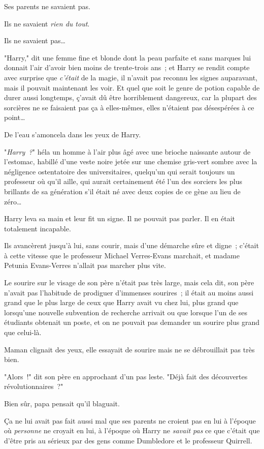 Ses parents ne savaient pas.

Ils ne savaient \emph{rien du tout}.

Ils ne savaient pas…

"Harry," dit une femme fine et blonde dont la peau parfaite et sans marques lui donnait l'air d'avoir bien moins de trente-trois ans~; et Harry se rendit compte avec surprise que \emph{c'était} de la magie, il n'avait pas reconnu les signes auparavant, mais il pouvait maintenant les voir. Et quel que soit le genre de potion capable de durer aussi longtemps, ç'avait dû être horriblement dangereux, car la plupart des sorcières ne se faisaient pas ça à elles-mêmes, elles n'étaient pas désespérées à ce point…

De l'eau s'amoncela dans les yeux de Harry.

"\emph{Harry~?}" héla un homme à l'air plus âgé avec une brioche naissante autour de l'estomac, habillé d'une veste noire jetée sur une chemise gris-vert sombre avec la négligence ostentatoire des universitaires, quelqu'un qui serait toujours un professeur où qu'il aille, qui aurait certainement été l'un des sorciers les plus brillants de sa génération s'il était né avec deux copies de ce gène au lieu de zéro…

Harry leva sa main et leur fit un signe. Il ne pouvait pas parler. Il en était totalement incapable.

Ils avancèrent jusqu'à lui, sans courir, mais d'une démarche sûre et digne~; c'était à cette vitesse que le professeur Michael Verres-Evans marchait, et madame Petunia Evans-Verres n'allait pas marcher plus vite.

Le sourire sur le visage de son père n'était pas très large, mais cela dit, son père n'avait pas l'habitude de prodiguer d'immenses sourires~; il était au moins aussi grand que le plus large de ceux que Harry avait vu chez lui, plus grand que lorsqu'une nouvelle subvention de recherche arrivait ou que lorsque l'un de ses étudiants obtenait un poste, et on ne pouvait pas demander un sourire plus grand que celui-là.

Maman clignait des yeux, elle essayait de sourire mais ne se débrouillait pas très bien.

"Alors~!" dit son père en approchant d'un pas leste. "Déjà fait des découvertes révolutionnaires~?"

Bien sûr, papa pensait qu'il blaguait.

Ça ne lui avait pas fait aussi mal que ses parents ne croient pas en lui à l'époque où \emph{personne} ne croyait en lui, à l'époque où Harry ne \emph{savait pas} ce que c'était que d'être pris au sérieux par des gens comme Dumbledore et le professeur Quirrell.

